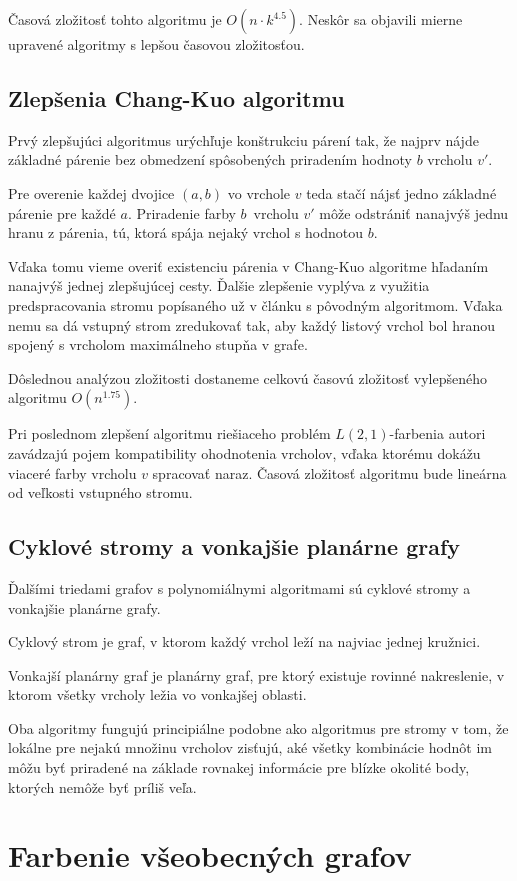 Časová zložitosť tohto algoritmu je $O(n \cdot k^{4.5})$\cite{chang_kuo}. Neskôr sa objavili
mierne upravené algoritmy s lepšou časovou zložitosťou.

\subsection{Zlepšenia Chang-Kuo algoritmu}

Prvý zlepšujúci algoritmus urýchľuje konštrukciu
párení tak, že najprv nájde základné párenie bez obmedzení spôsobených priradením hodnoty $b$
vrcholu $v'$.

Pre overenie každej dvojice $(a,b)$ vo vrchole $v$ teda stačí nájsť jedno základné
párenie pre každé $a$. Priradenie farby $b$ vrcholu $v'$ môže odstrániť nanajvýš jednu hranu z párenia,
tú, ktorá spája nejaký vrchol s hodnotou $b$. 

Vďaka tomu vieme overiť existenciu párenia v Chang-Kuo algoritme hľadaním nanajvýš
jednej zlepšujúcej cesty. Ďalšie zlepšenie vyplýva z využitia predspracovania stromu popísaného
už v článku s pôvodným algoritmom. Vďaka nemu sa dá vstupný strom zredukovať tak, aby každý
listový vrchol bol hranou spojený s vrcholom maximálneho stupňa v grafe\cite{chang_kuo}.

Dôslednou analýzou 
zložitosti dostaneme celkovú časovú zložitosť vylepšeného algoritmu $O(n^{1.75})$\cite{chang_kuo_improv}.

Pri poslednom zlepšení algoritmu riešiaceho problém $L(2,1)$-farbenia autori zavádzajú
pojem kompatibility ohodnotenia vrcholov, vďaka ktorému dokážu viaceré farby vrcholu $v$
spracovať naraz. Časová zložitosť algoritmu bude lineárna od veľkosti vstupného stromu\cite{chang_kuo_linear}.

\subsection{Cyklové stromy a vonkajšie planárne grafy}

Ďalšími triedami grafov s polynomiálnymi algoritmami sú cyklové stromy\cite{kaktusy} a vonkajšie
planárne grafy\cite{outer_planar}.

\begin{defn}
    Cyklový strom je graf, v ktorom každý vrchol leží na najviac jednej kružnici.
\end{defn}

\begin{defn}
    Vonkajší planárny graf je planárny graf, pre ktorý existuje rovinné nakreslenie, v ktorom
    všetky vrcholy ležia vo vonkajšej oblasti.
\end{defn}

Oba algoritmy fungujú principiálne podobne ako algoritmus pre stromy v tom, že lokálne pre
nejakú množinu vrcholov zisťujú, aké všetky kombinácie hodnôt im môžu byť priradené na
základe rovnakej informácie pre blízke okolité body, ktorých nemôže byť príliš veľa.

\section{Farbenie všeobecných grafov}
